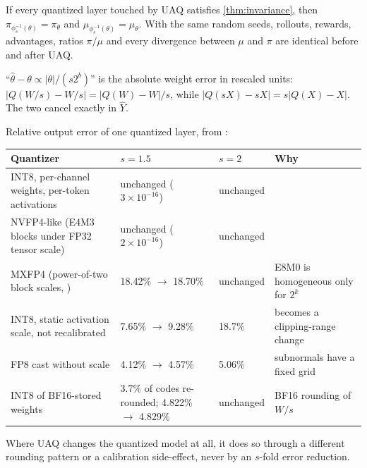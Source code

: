 \documentclass[11pt]{article}
\begin{document}
\begin{corollary}\label{cor:rollout}
If every quantized layer touched by UAQ satisfies \cref{thm:invariance}, then $\pi_{\phi_s^{-1}(\theta)}=\pi_\theta$ and $\mu_{\phi_s^{-1}(\theta)}=\mu_\theta$. With the same random seeds, rollouts, rewards, advantages, ratios $\pi/\mu$ and every divergence between $\mu$ and $\pi$ are identical before and after UAQ.
\end{corollary}

\begin{remark}
``$\hat\theta-\theta\propto|\theta|/(s2^b)$'' is the absolute weight error in rescaled units: $|Q(W/s)-W/s|=|Q(W)-W|/s$, while $|Q(sX)-sX|=s|Q(X)-X|$. The two cancel exactly in $\hat Y$.
\end{remark}

\begin{remark}\label{rem:scope}
Relative output error of one quantized layer, from :
\begin{center}\small
\begin{tabularx}{\linewidth}{@{}L l l L@{}}
\toprule
Quantizer & $s=1.5$ & $s=2$ & Why\\
\midrule
INT8, per-channel weights, per-token activations & unchanged ($3\times10^{-16}$) & unchanged & \\
NVFP4-like (E4M3 blocks under FP32 tensor scale) & unchanged ($2\times10^{-16}$) & unchanged & \\
MXFP4 (power-of-two block scales, \citealp{rouhani2023mx}) & 18.42\% $\to$ 18.70\% & unchanged & E8M0 is homogeneous only for $2^k$\\
INT8, static activation scale, not recalibrated & 7.65\% $\to$ 9.28\% & 18.7\% & becomes a clipping-range change\\
FP8 cast without scale & 4.12\% $\to$ 4.57\% & 5.06\% & subnormals have a fixed grid\\
INT8 of BF16-stored weights & \parbox[t]{9em}{\raggedright 3.7\% of codes re-rounded; 4.822\% $\to$ 4.829\%} & unchanged & BF16 rounding of $W/s$\\
\bottomrule
\end{tabularx}
\end{center}
Where UAQ changes the quantized model at all, it does so through a different rounding pattern or a calibration side-effect, never by an $s$-fold error reduction.
\end{remark}
\end{document}
